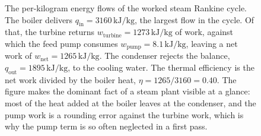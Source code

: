 \begin{figure}[htbp]
\centering
{}
\caption[Energy accounting for the worked Rankine cycle]{The per-kilogram
energy flows of the worked steam Rankine cycle. The boiler delivers
$q_{\text{in}}=3160\,\text{kJ}/\text{kg}$, the largest flow in the cycle.
Of that, the turbine returns $w_{\text{turbine}}=1273\,\text{kJ}/\text{kg}$
of work, against which the feed pump consumes
$w_{\text{pump}}=8.1\,\text{kJ}/\text{kg}$, leaving a net work of
$w_{\text{net}}=1265\,\text{kJ}/\text{kg}$. The condenser rejects the
balance, $q_{\text{out}}=1895\,\text{kJ}/\text{kg}$, to the cooling water.
The thermal efficiency is the net work divided by the boiler heat,
$\eta = 1265/3160 = 0.40$. The figure makes the dominant fact of a steam
plant visible at a glance: most of the heat added at the boiler leaves at
the condenser, and the pump work is a rounding error against the turbine
work, which is why the pump term is so often neglected in a first pass.}
\label{fig:vol04ch02:rankine-energy-balance}
\end{figure}
